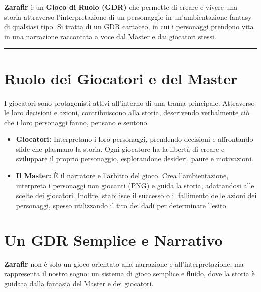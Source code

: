 \documentclass[../manuale_main.tex]{subfiles}
\begin{document}
\textbf{Zarafir} è un \textbf{Gioco di Ruolo (GDR)} che permette di creare e vivere una storia attraverso l’interpretazione di un personaggio in un’ambientazione fantasy di qualsiasi tipo. Si tratta di un GDR cartaceo, in cui i personaggi prendono vita in una narrazione raccontata a voce dal Master e dai giocatori stessi.
\vspace{0.5cm}
\noindent
\begin{center}
\rule{\textwidth}{0.4pt} 
\end{center}
\vspace{0.5cm}

\section{Ruolo dei Giocatori e del Master}
I giocatori sono protagonisti attivi all’interno di una trama principale. Attraverso le loro decisioni e azioni, contribuiscono alla storia, descrivendo verbalmente ciò che i loro personaggi fanno, pensano e sentono. 

\begin{itemize}
    \item \textbf{Giocatori:} Interpretano i loro personaggi, prendendo decisioni e affrontando sfide che plasmano la storia. Ogni giocatore ha la libertà di creare e sviluppare il proprio personaggio, esplorandone desideri, paure e motivazioni.
    
    \item \textbf{Il Master:} È il narratore e l’arbitro del gioco. Crea l’ambientazione, interpreta i personaggi non giocanti (PNG) e guida la storia, adattandosi alle scelte dei giocatori. Inoltre, stabilisce il successo o il fallimento delle azioni dei personaggi, spesso utilizzando il tiro dei dadi per determinare l'esito.
\end{itemize}

\vspace{0.3cm}

\section{Un GDR Semplice e Narrativo}
\textbf{Zarafir} non è solo un gioco orientato alla narrazione e all’interpretazione, ma rappresenta il nostro sogno: un sistema di gioco semplice e fluido, dove la storia è guidata dalla fantasia del Master e dei giocatori. 
\end{document}

